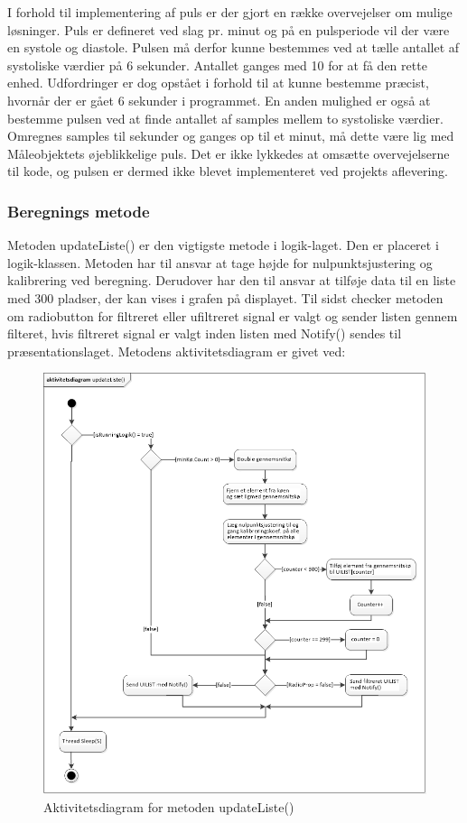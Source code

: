 I forhold til implementering af puls er der gjort en række overvejelser om mulige løsninger. Puls er defineret ved slag pr. minut og på en pulsperiode vil der være en systole og diastole. Pulsen må derfor kunne bestemmes ved at tælle antallet af systoliske værdier på 6 sekunder. Antallet ganges med 10 for at få den rette enhed. Udfordringer er dog opstået i forhold til at kunne bestemme præcist, hvornår der er gået 6 sekunder i programmet. En anden mulighed er også at bestemme pulsen ved at finde antallet af samples mellem to systoliske værdier. Omregnes samples til sekunder og ganges op til et minut, må dette være lig med Måleobjektets øjeblikkelige puls. Det er ikke lykkedes at omsætte overvejelserne til kode, og pulsen er dermed ikke blevet implementeret ved projekts aflevering.

\subsubsection{Beregnings metode}
Metoden updateListe() er den vigtigste metode i logik-laget. Den er placeret i logik-klassen. Metoden har til ansvar at tage højde for nulpunktsjustering og kalibrering ved beregning. Derudover har den til ansvar at tilføje data til en liste med 300 pladser, der kan vises i grafen på displayet. Til sidst checker metoden om radiobutton for filtreret eller ufiltreret signal er valgt og sender listen gennem filteret, hvis filtreret signal er valgt inden listen med Notify() sendes til præsentationslaget. Metodens aktivitetsdiagram er givet ved:
\begin{figure}[H]
	\centering
	\includegraphics[width=1.0\textwidth]{Figurer/AktUpdateListe}
	\caption{Aktivitetsdiagram for metoden updateListe()}
	\label{fig:Aktivitetsdiagram_updateListe}
\end{figure}

